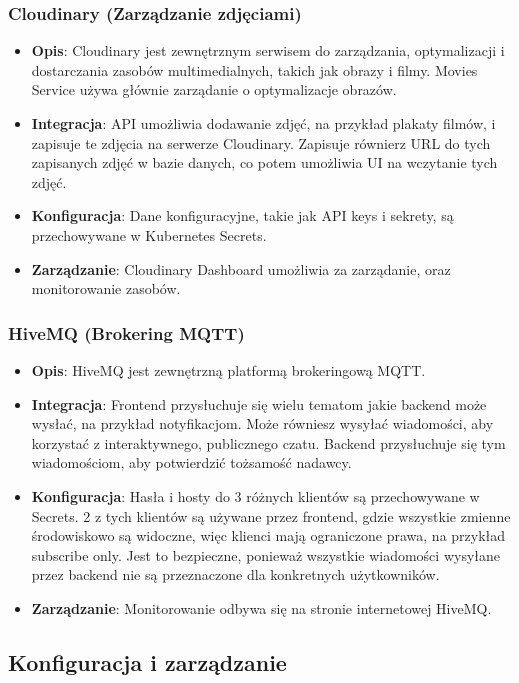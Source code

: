 \documentclass[12pt,a4paper]{article}
\begin{document}
\subsubsection{Cloudinary (Zarządzanie zdjęciami)}
\begin{itemize}
    \item \textbf{Opis}: Cloudinary jest zewnętrznym serwisem do zarządzania, optymalizacji i dostarczania zasobów multimedialnych, takich jak obrazy i filmy. Movies Service używa głównie zarządanie o optymalizacje obrazów.
    \item \textbf{Integracja}: API umożliwia dodawanie zdjęć, na przykład plakaty filmów, i zapisuje te zdjęcia na serwerze Cloudinary. Zapisuje równierz URL do tych zapisanych zdjęć w bazie danych, co potem umożliwia UI na wczytanie tych zdjęć.
    \item \textbf{Konfiguracja}: Dane konfiguracyjne, takie jak API keys i sekrety, są przechowywane w Kubernetes Secrets.
    \item \textbf{Zarządzanie}: Cloudinary Dashboard umożliwia za zarządanie, oraz monitorowanie zasobów.
\end{itemize}

\subsubsection{HiveMQ (Brokering MQTT)}
\begin{itemize}
    \item \textbf{Opis}: HiveMQ jest zewnętrzną platformą brokeringową MQTT.
    \item \textbf{Integracja}: Frontend przysłuchuje się wielu tematom jakie backend może wysłać, na przykład notyfikacjom. Może równiesz wysyłać wiadomości, aby korzystać z interaktywnego, publicznego czatu. Backend przysłuchuje się tym wiadomościom, aby potwierdzić tożsamość nadawcy.
    \item \textbf{Konfiguracja}: Hasła i hosty do 3 różnych klientów są przechowywane w Secrets. 2 z tych klientów są używane przez frontend, gdzie wszystkie zmienne środowiskowo są widoczne, więc klienci mają ograniczone prawa, na przykład subscribe only. Jest to bezpieczne, ponieważ wszystkie wiadomości wysyłane przez backend nie są przeznaczone dla konkretnych użytkowników.
    \item \textbf{Zarządzanie}: Monitorowanie odbywa się na stronie internetowej HiveMQ.
\end{itemize}

\subsection{Konfiguracja i zarządzanie}
\label{sec:NonFunctionalConditions}
\end{document}
